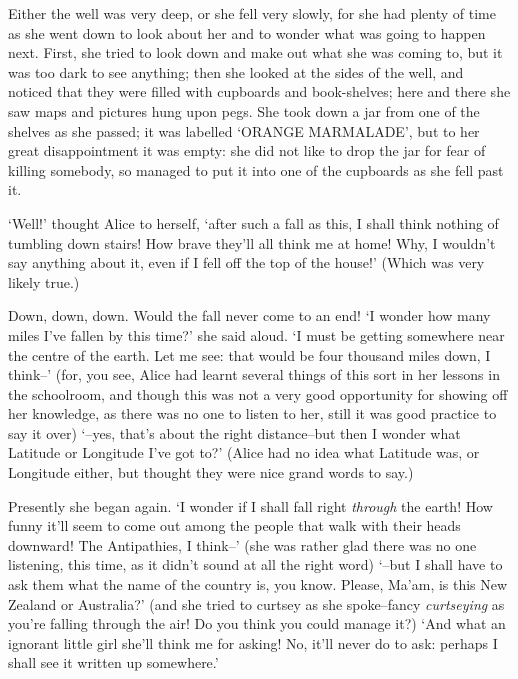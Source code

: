 \documentclass{article}
\begin{document}

Either the well was very deep, or she fell very slowly, for she had plenty of time as she went down to look about her and to wonder what was going to happen next. First, she tried to look down and make out what she was coming to, but it was too dark to see anything; then she looked at the sides of the well, and noticed that they were filled with cupboards and book-shelves; here and there she saw maps and pictures hung upon pegs. She took down a jar from one of the shelves as she passed; it was labelled `ORANGE MARMALADE', but to her great disappointment it was empty: she did not like to drop the jar for fear of killing somebody, so managed to put it into one of the cupboards as she fell past it.

`Well!' thought Alice to herself, `after such a fall as this, I shall think nothing of tumbling down stairs! How brave they'll all think me at home! Why, I wouldn't say anything about it, even if I fell off the top of the house!' (Which was very likely true.)

Down, down, down. Would the fall never come to an end! `I wonder how many miles I've fallen by this time?' she said aloud. `I must be getting somewhere near the centre of the earth. Let me see: that would be four thousand miles down, I think--' (for, you see, Alice had learnt several things of this sort in her lessons in the schoolroom, and though this was not a very good opportunity for showing off her knowledge, as there was no one to listen to her, still it was good practice to say it over) `--yes, that's about the right distance--but then I wonder what Latitude or Longitude I've got to?' (Alice had no idea what Latitude was, or Longitude either, but thought they were nice grand words to say.)

Presently she began again. `I wonder if I shall fall right \textit{through} the earth! How funny it'll seem to come out among the people that walk with their heads downward! The Antipathies, I think--' (she was rather glad there was no one listening, this time, as it didn't sound at all the right word) `--but I shall have to ask them what the name of the country is, you know. Please, Ma'am, is this New Zealand or Australia?' (and she tried to curtsey as she spoke--fancy \textit{curtseying} as you're falling through the air! Do you think you could manage it?) `And what an ignorant little girl she'll think me for asking! No, it'll never do to ask: perhaps I shall see it written up somewhere.'
\end{document}
